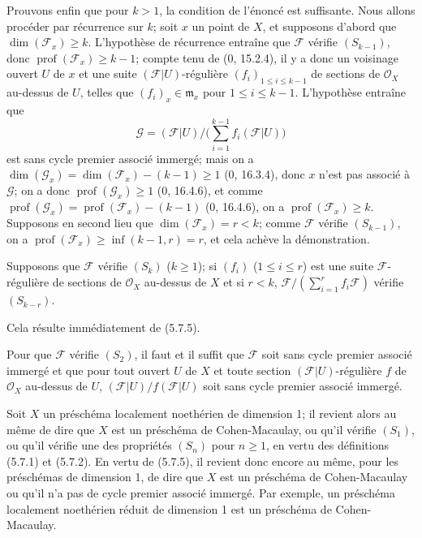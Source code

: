 Prouvons enfin que pour $k>1$, la condition de l'énoncé est suffisante. Nous
allons procéder par récurrence sur $k$; soit $x$ un point de $X$, et
supposons d'abord que $\dim(\mathscr F_x)\geq k$. L'hypothèse de récurrence
entraîne que $\mathscr F$ vérifie $(S_{k-1})$, donc
$\operatorname{prof}(\mathscr F_x)\geq k-1$; compte tenu de (0, 15.2.4), il
y a donc un voisinage ouvert $U$ de $x$ et une suite
$(\mathscr F|U)$-régulière $(f_i)_{1\leq i\leq k-1}$ de sections de
$\mathcal O_X$ au-dessus de $U$, telles que $(f_i)_x\in\mathfrak m_x$ pour
$1\leq i\leq k-1$. L'hypothèse entraîne que
\[
\mathscr G=(\mathscr F|U)\big/\Big(\sum_{i=1}^{k-1}
f_i(\mathscr F|U)\Big)
\]
est sans cycle premier associé immergé; mais on a
$\dim(\mathscr G_x)=\dim(\mathscr F_x)-(k-1)\geq1$ (0, 16.3.4), donc $x$
n'est pas associé à $\mathscr G$; on a donc
$\operatorname{prof}(\mathscr G_x)\geq1$ (0, 16.4.6), et comme
$\operatorname{prof}(\mathscr G_x)=\operatorname{prof}(\mathscr F_x)-(k-1)$
(0, 16.4.6), on a $\operatorname{prof}(\mathscr F_x)\geq k$. Supposons en
second lieu que $\dim(\mathscr F_x)=r<k$; comme $\mathscr F$ vérifie
$(S_{k-1})$, on a
$\operatorname{prof}(\mathscr F_x)\geq\inf(k-1,r)=r$, et cela achève la
démonstration.

\begin{corollary}[5.7.6]
\label{IV.2.s5.7.6-fr}
Supposons que $\mathscr F$ vérifie $(S_k)$ ($k\geq1$); si
$(f_i)$ ($1\leq i\leq r$) est une suite $\mathscr F$-régulière de sections
de $\mathcal O_X$ au-dessus de $X$ et si $r<k$,
$\mathscr F/(\sum_{i=1}^r f_i\mathscr F)$ vérifie $(S_{k-r})$.
\end{corollary}

Cela résulte immédiatement de (5.7.5).

\begin{corollary}[5.7.7]
\label{IV.2.s5.7.7-fr}
Pour que $\mathscr F$ vérifie $(S_2)$, il faut et il suffit que $\mathscr F$
soit sans cycle premier associé immergé et que pour tout ouvert $U$ de $X$
et toute section $(\mathscr F|U)$-régulière $f$ de $\mathcal O_X$ au-dessus
de $U$, $(\mathscr F|U)/f(\mathscr F|U)$ soit sans cycle premier associé
immergé.
\end{corollary}


\begin{remarks}[5.7.8]
\label{IV.2.s5.7.8-fr}
Soit $X$ un préschéma localement noethérien de dimension 1; il revient alors
au même de dire que $X$ est un préschéma de Cohen-Macaulay, ou qu'il vérifie
$(S_1)$, ou qu'il vérifie une des propriétés $(S_n)$ pour $n\geq1$, en vertu
des définitions (5.7.1) et (5.7.2). En vertu de (5.7.5), il revient donc
encore au même, pour les préschémas de dimension 1, de dire que $X$ est un
préschéma de Cohen-Macaulay ou qu'il n'a pas de cycle premier associé
immergé. Par exemple, un préschéma localement noethérien réduit de dimension
1 est un préschéma de Cohen-Macaulay.
\end{remarks}

